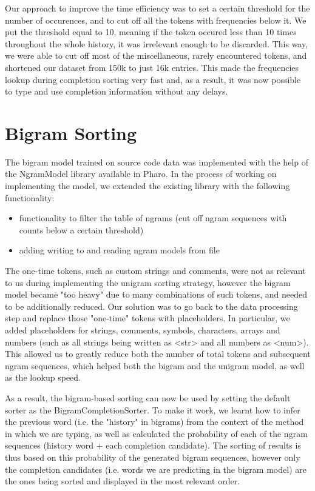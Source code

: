 Our approach to improve the time efficiency was to set a certain threshold for the number of occurences, and to cut off all the tokens with frequencies below it. We put the threshold equal to 10, meaning if the token occured less than 10 times throughout the whole history, it was irrelevant enough to be discarded. This way, we were able to cut off most of the miscellaneous, rarely encountered tokens, and shortened our dataset from 150k to just 16k entries. This made the frequencies lookup during completion sorting very fast and, as a result, it was now possible to type and use completion information without any delays.

\section{Bigram Sorting}
The bigram model trained on source code data was implemented with the help of the NgramModel library available in Pharo. In the process of working on implementing the model, we extended the existing library with the following functionality:
\begin{itemize}
    \item functionality to filter the table of ngrams (cut off ngram sequences with counts below a certain threshold)
    \item adding writing to and reading ngram models from file
\end{itemize}
The one-time tokens, such as custom strings and comments, were not as relevant to us during implementing the unigram sorting strategy, however the bigram model became "too heavy" due to many combinations of such tokens, and needed to be additionally reduced. Our solution was to go back to the data processing step and replace those "one-time" tokens with placeholders. In particular, we added placeholders for strings, comments, symbols, characters, arrays and numbers (such as all strings being written as <str> and all numbers as <num>). This allowed us to greatly reduce both the number of total tokens and subsequent ngram sequences, which helped both the bigram and the unigram model, as well as the lookup speed.

As a result, the bigram-based sorting can now be used by setting the default sorter as the BigramCompletionSorter. To make it work, we learnt how to infer the previous word (i.e. the "history" in bigrams) from the context of the method in which we are typing, as well as calculated the probability of each of the ngram sequences (history word + each completion candidate). The sorting of results is thus based on this probability of the generated bigram sequences, however only the completion candidates (i.e. words we are predicting in the bigram model) are the ones being sorted and displayed in the most relevant order.